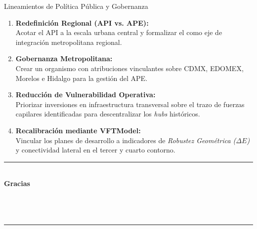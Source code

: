 \begin{frame}{Lineamientos de Política Pública y Gobernanza}
  \begin{enumerate}
    \item \textbf{Redefinición Regional (API vs. APE):} \\
          Acotar el API a la escala urbana central y formalizar el  como 
          eje de integración metropolitana regional.
    \item \textbf{Gobernanza Metropolitana:} \\
          Crear un organismo con atribuciones vinculantes sobre CDMX, EDOMEX, Morelos e Hidalgo para la gestión del 
          APE.
    \item \textbf{Reducción de Vulnerabilidad Operativa:} \\
          Priorizar inversiones en infraestructura transversal sobre el trazo de fuerzas capilares identificadas 
          para descentralizar los \textit{hubs} históricos.
    \item \textbf{Recalibración mediante VFTModel:} \\
          Vincular los planes de desarrollo a indicadores de \textit{Robustez Geométrica ($\Delta E$)} y 
          conectividad lateral en el tercer y cuarto contorno.
  \end{enumerate}
\end{frame}

\begin{frame}[plain]
  \begin{center}
    \vfill
    {\color{ColorAcento}\rule{0.6\textwidth}{1.5pt}}\\[0.5cm]
    {\Large\bfseries\color{ColorPrincipal} Gracias}\\[0.3cm]
    {\normalsize \Autor}\\[0.1cm]
    {\small \MateriaCorta}\\[0.1cm]
    {\small \Semestre}\\[0.5cm]
    {\color{ColorAcento}\rule{0.6\textwidth}{1.5pt}}
    \vfill
  \end{center}
\end{frame}